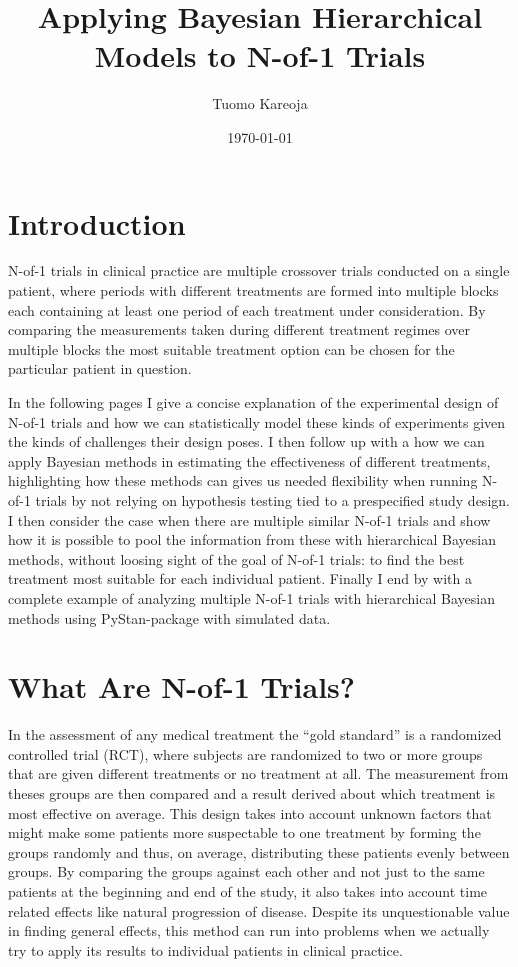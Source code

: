 \documentclass[12pt,a4paper,leqno]{report}
\title{Applying Bayesian Hierarchical Models to N-of-1 Trials}
\author{Tuomo Kareoja}
\date{\today}
\theoremstyle{plain}
\theoremstyle{definition}
\theoremstyle{remark}
\begin{document}
\maketitle

\tableofcontents

\chapter*{Introduction}\label{intro}

N-of-1 trials in clinical practice are multiple crossover trials conducted on
a single patient, where periods with different treatments are formed
into multiple blocks each containing at least one period of each treatment
under consideration\cite{nofone}. By comparing the measurements taken during
different treatment regimes over multiple blocks the most suitable treatment
option can be chosen for the particular patient in question.

In the following pages I give a concise explanation of the experimental design
of N-of-1 trials and how we can statistically model these kinds of experiments
given the kinds of challenges their design poses.
I then follow up with a how we can apply Bayesian methods in estimating the
effectiveness of different treatments, highlighting how these methods can gives us
needed flexibility when running N-of-1 trials by not relying on hypothesis testing
tied to a prespecified study design. I then consider the case when there are
multiple similar N-of-1 trials and show how it is possible to pool the
information from these with hierarchical Bayesian methods, without loosing
sight of the goal of N-of-1 trials: to find the best
treatment most suitable for each individual patient.
Finally I end by with a complete example of analyzing multiple N-of-1
trials with hierarchical Bayesian methods using PyStan-package with simulated
data.

\chapter{What Are N-of-1 Trials?}\label{nof1}

In the assessment of any medical treatment the ``gold standard'' is a randomized
controlled trial (RCT), where subjects are randomized to two or more groups
that are given different treatments or no treatment at all. The measurement
from theses groups are then compared and a result derived about which treatment
is most effective on average. This design takes into account unknown factors
that might make some patients more suspectable to one treatment by forming the
groups randomly and thus, on average, distributing these patients evenly
between groups. By comparing the groups against each other and not just to the
same patients at the beginning and end of the study, it also takes into account
time related effects like natural progression of disease. Despite its
unquestionable value in finding general effects, this method can run into problems
when we actually try to apply its results to individual patients in clinical practice.
\end{document}

